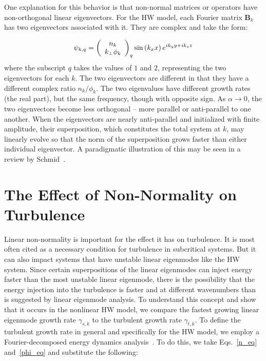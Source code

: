 \documentclass[letter,scriptaddress,twocolumn, prl,showkeys]{revtex4}
\def\beq{\begin{equation}}
\def\eeq{\end{equation}}
\begin{document}
One explanation for this behavior is that non-normal matrices or operators have non-orthogonal linear eigenvectors. For the HW model, each Fourier matrix $\mathbf{B}_k$ has two eigenvectors associated
with it. They are complex and take the form:

\beq
\label{lin_eigen_form}
\psi_{k,q} = \left( \begin{array}{cc} n_k \\ k_\perp \phi_k \end{array} \right)_q {\rm sin} \left( k_x x \right) e^{i k_y y + i k_z z} 
\eeq
where the subscript $q$ takes the values of $1$ and $2$, representing the two eigenvectors for each $k$. The two eigenvectors are different in that they have a different complex ratio $n_k/\phi_k$.
The two eigenvalues have different growth rates (the real part), but the same frequency, though with opposite sign.
As $\alpha \to 0$, the two eigenvectors become less orthogonal -- more parallel or anti-parallel to one another. When the eigenvectors are nearly anti-parallel and initialized with finite amplitude,
their superposition, which constitutes the total system at $k$, may linearly evolve so that the norm of the superposition grows faster than either individual eigenvector. A paradigmatic illustration
of this may be seen in a review by Schmid~\cite{schmid2007}.

\section{The Effect of Non-Normality on Turbulence}
\label{sec_non_norm_turb}

Linear non-normality is important for the effect it has on turbulence. It is most often cited as a necessary condition for turbulence in subcritical systems. 
But it can also impact systems that have unstable linear eigenmodes like the HW system. Since certain superpositions of the linear eigenmodes can inject energy faster than the most unstable linear
eigenmode, there is the possibility that the energy injection into the turbulence is faster and at different wavenumbers than is suggested by linear eigenmode analysis. 
To understand this concept and show that it occurs in the nonlinear HW model, we compare the fastest growing linear eigenmode growth rate $\gamma_{s,k}$ to the turbulent growth rate $\gamma_{t,k}$. 
To define the turbulent growth rate in general and specifically for the HW model, we employ a Fourier-decomposed energy dynamics analysis~\cite{camargo1995,friedman2012b,friedman2013}. 
To do this, we take Eqs.~\ref{n_eq} and~\ref{phi_eq} and substitute the following:
\end{document}
